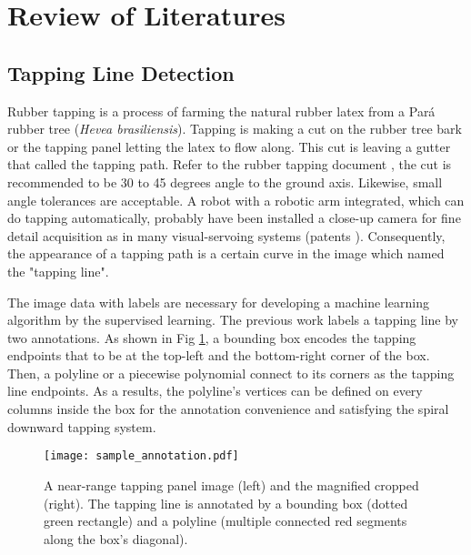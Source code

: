 \documentclass[default,pdflatex,iicol]{sn-jnl}%
\begin{document}
\section{Review of Literatures}\label{sec-review}
\subsection{Tapping Line Detection}
Rubber tapping is a process of farming the natural rubber latex from a Pará rubber tree (\textit{Hevea brasiliensis}). Tapping is making a cut on the rubber tree bark or the tapping panel letting the latex to flow along. This cut is leaving a gutter that called the tapping path. Refer to the rubber tapping document \cite{abraham1992tapping}, the cut is recommended to be 30 to 45 degrees angle to the ground axis. Likewise, small angle tolerances are acceptable. A robot with a robotic arm integrated, which can do tapping automatically, probably have been installed a close-up camera for fine detail acquisition as in many visual-servoing systems (patents \cite{patent1, patent2, patent3}). Consequently, the appearance of a tapping path is a certain curve in the image which named the "tapping line".

The image data with labels are necessary for developing a machine learning algorithm by the supervised learning. The previous work \cite{Wongtanawijit_2021} labels a tapping line by two annotations. As shown in Fig \ref{fig-sampleannotation}, a bounding box encodes the tapping endpoints that to be at the top-left and the bottom-right corner of the box. Then, a polyline or a piecewise polynomial connect to its corners as the tapping line endpoints. As a results, the polyline's vertices can be defined on every columns inside the box for the annotation convenience and satisfying the spiral downward tapping system.

\begin{figure}[h]%
\centering
\texttt{[image: sample\_annotation.pdf]}
\caption{A near-range tapping panel image (left) and the magnified cropped (right). The tapping line is annotated by a bounding box (dotted green rectangle) and a polyline (multiple connected red segments along the box's diagonal).}\label{fig-sampleannotation}
\end{figure}
\end{document}
